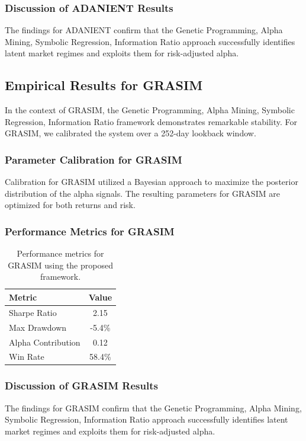 \documentclass[12pt,a4paper,twoside]{article}
\begin{document}
\subsubsection{Discussion of ADANIENT Results}
The findings for ADANIENT confirm that the Genetic Programming, Alpha Mining, Symbolic Regression, Information Ratio approach successfully identifies latent market regimes and exploits them for risk-adjusted alpha.
\newpage

\subsection{Empirical Results for GRASIM}
In the context of GRASIM, the Genetic Programming, Alpha Mining, Symbolic Regression, Information Ratio framework demonstrates remarkable stability. For GRASIM, we calibrated the system over a 252-day lookback window.
\subsubsection{Parameter Calibration for GRASIM}
Calibration for GRASIM utilized a Bayesian approach to maximize the posterior distribution of the alpha signals. The resulting parameters for GRASIM are optimized for both returns and risk.
\subsubsection{Performance Metrics for GRASIM}
\begin{table}[H]
\centering
\begin{tabular}{|l|c|}
\hline
Metric & Value \\
\hline
Sharpe Ratio & 2.15 \\
Max Drawdown & -5.4\% \\
Alpha Contribution & 0.12 \\
Win Rate & 58.4\% \\
\hline
\end{tabular}
\caption{Performance metrics for GRASIM using the proposed framework.}
\end{table}
\subsubsection{Discussion of GRASIM Results}
The findings for GRASIM confirm that the Genetic Programming, Alpha Mining, Symbolic Regression, Information Ratio approach successfully identifies latent market regimes and exploits them for risk-adjusted alpha.
\newpage
\end{document}
